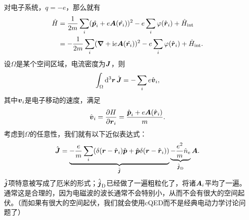 \documentclass[hyperref, UTF8, a4paper]{ctexart}
\newcommand*{\ii}{\mathrm{i}}
\begin{document}
对电子系统，$q=-e$，那么就有
\begin{equation}
    \begin{aligned}
        \hat{H} &= \frac{1}{2m} \sum_i (\hat{\vb*{p}_i} + e \vb*{A}(\hat{\vb*{r}_i}))^2 - e \sum_i \varphi(\hat{\vb*{r}}_i) + \hat{H}_\text{int} \\ 
        &= - \frac{1}{2m} \sum_i (\grad + \ii e \vb*{A}(\hat{\vb*{r}_i}))^2 - e \sum_i \varphi(\hat{\vb*{r}}_i) + \hat{H}_\text{int}.
    \end{aligned}
\end{equation}
设$\Omega$是某个空间区域，电流密度为$\vb*{J}$，则
\begin{equation}
    \int_\Omega \dd[3]{\vb*{r}} \hat{\vb*{J}} = - \sum_i e \hat{\vb*{v}}_i,
\end{equation}
其中$\vb*{v}_i$是电子移动的速度，满足
\begin{equation}
    \hat{\vb*{v}}_i = \pdv{H}{\vb*{r}_i} = \frac{\hat{\vb*{p}}_i + e \vb*{A}(\hat{\vb*{r}}_i)}{m}.
\end{equation}
考虑到$\Omega$的任意性，我们就有以下近似表达式：
\begin{equation}
    \hat{\vb*{J}} = \underbrace{- \frac{e}{m} \sum_i ( \delta(\vb*{r} - \hat{\vb*{r}}_i) \hat{\vb*{p}} + \hat{\vb*{p}} \delta(\vb*{r} - \hat{\vb*{r}}_i) )}_{\hat{\vb*{j}}} \underbrace{- \frac{e^2}{m} \hat{n}_\text{e}}_{\hat{\vb*{j}}_\text{D}} \vb*{A}.
\end{equation}
$\hat{\vb*{j}}$项特意被写成了厄米的形式；$\hat{\vb*{j}}_\text{D}$已经做了一遍粗粒化了，将诸$\vb*{A}_i$平均了一遍。
通常这是合理的，因为电磁波的波长通常不会特别小，从而不会有很大的空间起伏。（而如果有很大的空间起伏，我们就会使用cQED而不是经典电动力学讨论问题了）
\end{document}

